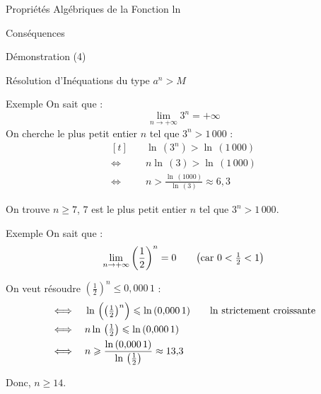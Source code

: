 \documentclass{cours}
\begin{document}
\begin{Gpartie}{Propriétés Algébriques de la Fonction ln}
\begin{Spartie}{Conséquences}
\begin{enumerate}[(1)]
\begin{SSpartie}{Démonstration (4)}
                \end{SSpartie}
            \end{enumerate}
        \end{Spartie}
    \end{Gpartie}
    \begin{Gpartie}{Résolution d'Inéquations du type $a^n>M$}
        \vspace{-2ex}
        \begin{Spartie}{Exemple}
            On sait que : \[\lim_{n\to+\infty}3^n=+\infty\]
            On cherche le plus petit entier $n$ tel que $3^n>1\,000$ :
            \[\begin{aligned}[t]
                &\quad\ln\,\left(3^n\right)>\ln\,(1\,000) \\
                \iff&\quad n\ln\,(3)>\ln\,(1\,000) \\
                \iff&\quad n>\frac{\ln\,(1000)}{\ln\,(3)}\approx 6{,}3
            \end{aligned}\]

            On trouve $n\geq 7$, $7$ est le plus petit entier $n$ tel que $3^n>1\,000$.
        \end{Spartie}
        \vspace{-2ex}
        \begin{Spartie}{Exemple}
            On sait que : \[\lim_{n\to+\infty}\left(\frac{1}{2}\right)^n=0\text{\qquad \big(car $0<\tfrac{1}{2}<1$\big)}\]
            
            On veut résoudre $\left(\frac{1}{2}\right)^n\leq 0{,}000\,1$ :
            \[\begin{aligned}[t]
                \iff&\quad\ln\,\Big(\big(\tfrac{1}{2}\big)^n\Big)\leq\ln\,(0{,}000\,1)\text{\qquad $\ln$ strictement croissante} \\
                \iff&\quad n\ln\,\big(\tfrac{1}{2}\big)\leq\ln\,(0{,}000\,1) \\
                \iff&\quad n\geq\frac{\ln\,(0{,}000\,1)}{\ln\,\left(\frac{1}{2}\right)}\approx13{,}3
            \end{aligned}\]

            Donc, $n\geq 14$.
        \end{Spartie}
    \end{Gpartie}
    \vspace{-2ex}
\end{document}
